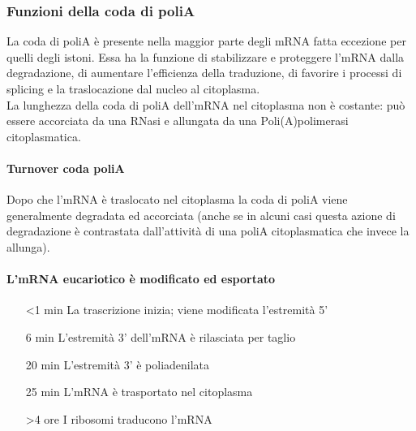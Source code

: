 \documentclass{article}
\begin{document}
\subsubsection{Funzioni della coda di poliA}
La coda di poliA è presente nella maggior parte degli mRNA fatta eccezione per quelli degli istoni.
Essa ha la funzione di stabilizzare e proteggere l'mRNA dalla degradazione, di aumentare l'efficienza della traduzione, di favorire i processi di splicing e la traslocazione dal nucleo al citoplasma.\\
La lunghezza della coda di poliA dell'mRNA nel citoplasma non è costante: può essere accorciata da una RNasi e allungata da una Poli(A)polimerasi citoplasmatica.
\paragraph{Turnover coda poliA}
Dopo che l'mRNA è traslocato nel citoplasma la
coda di poliA viene generalmente degradata ed
accorciata (anche se in alcuni casi questa azione di
degradazione è contrastata dall'attività di una poliA
citoplasmatica che invece la allunga).
\paragraph{L'mRNA eucariotico è modificato ed esportato}
\begin{itemize}
    \item[<1 min] La trascrizione inizia; viene modificata l'estremità 5'
    \item[6 min] L'estremità 3' dell'mRNA è rilasciata per taglio
    \item[20 min] L'estremità 3' è poliadenilata 
    \item[25 min] L'mRNA è trasportato nel citoplasma
    \item[>4 ore] I ribosomi traducono l'mRNA  
\end{itemize}
\end{document}
